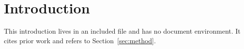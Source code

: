 \section{Introduction}
\label{sec:intro}

This introduction lives in an included file and has no document environment.
It cites prior work \cite{smith2020} and refers to Section~\ref{sec:method}.


